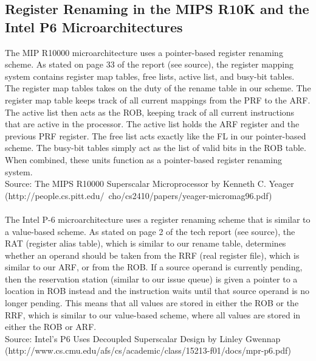 \documentclass[10pt]{article}
\begin{document}
\subsection{Register Renaming in the MIPS R10K and the Intel P6 Microarchitectures}
The MIP R10000 microarchitecture uses a pointer-based register renaming scheme. As stated on page 33 of the report (see source), the register mapping system contains register map tables, free lists, active list, and busy-bit tables. The register map tables takes on the duty of the rename table in our scheme. The register map table keeps track of all current mappings from the PRF to the ARF. The active list then acts as the ROB, keeping track of all current instructions that are active in the processor. The active list holds the ARF register and the previous PRF register. The free list acts exactly like the FL in our pointer-based scheme. The busy-bit tables simply act as the list of valid bits in the ROB table. When combined, these units function as a pointer-based register renaming system.\\ 
Source: The MIPS R10000 Superscalar Microprocessor by Kenneth C. Yeager \\
(http://people.cs.pitt.edu/~cho/cs2410/papers/yeager-micromag96.pdf) \\
\\
The Intel P-6 microarchitecture uses a register renaming scheme that is similar to a value-based scheme. As stated on page 2 of the tech report (see source), the RAT (register alias table), which is similar to our rename table, determines whether an operand should be taken from the RRF (real register file), which is similar to our ARF, or from the ROB. If a source operand is currently pending, then the reservation station (similar to our issue queue) is given a pointer to a location in ROB instead and the instruction waits until that source operand is no longer pending. This means that all values are stored in either the ROB or the RRF, which is similar to our value-based scheme, where all values are stored in either the ROB or ARF. 
\\
Source: Intel's P6 Uses Decoupled Superscalar Design by Linley Gwennap \\
(http://www.cs.cmu.edu/afs/cs/academic/class/15213-f01/docs/mpr-p6.pdf)\\
\end{document}
